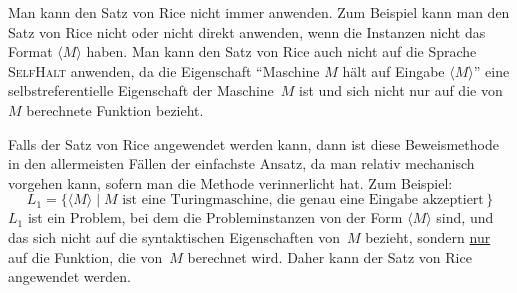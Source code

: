 \documentclass[a4paper,11pt,oneside,ngerman]{scrartcl}
\begin{document}
Man kann den Satz von Rice nicht immer anwenden. Zum Beispiel kann man den Satz von Rice nicht oder nicht direkt anwenden, wenn die Instanzen nicht das Format $\langle M\rangle$ haben. Man kann den Satz von Rice auch nicht auf die Sprache \textsc{SelfHalt} anwenden, da die Eigenschaft \enquote{Maschine $M$ hält auf Eingabe $\langle M\rangle$} eine selbstreferentielle Eigenschaft der Maschine~$M$ ist und sich nicht nur auf die von $M$ berechnete Funktion bezieht.

Falls der Satz von Rice angewendet werden kann, dann ist diese Beweismethode in den allermeisten Fällen der einfachste Ansatz, da man relativ mechanisch vorgehen kann, sofern man die Methode verinnerlicht hat. Zum Beispiel:
\[
    L_1 = \Big\{\langle M\rangle\;\big|\; \text{$M$ ist eine Turingmaschine, die genau eine Eingabe akzeptiert}\,\Big\}
\]
$L_1$ ist ein Problem, bei dem die Probleminstanzen von der Form $\langle M\rangle$ sind, und das sich nicht auf die syntaktischen Eigenschaften von~$M$ bezieht, sondern \underline{nur} auf die Funktion, die von~$M$ berechnet wird.
Daher kann der Satz von Rice angewendet werden.
\end{document}
